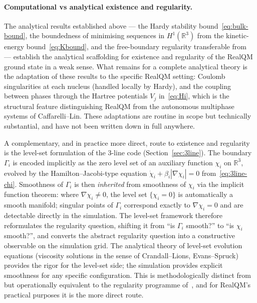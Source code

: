 \documentclass[11pt]{article}
\begin{document}
\paragraph{Computational vs analytical existence and regularity.}
The analytical results established above --- the Hardy stability bound~\eqref{eq:bulk-bound}, the boundedness of minimising sequences in $H^1(\mathbb{R}^3)$ from the kinetic-energy bound~\eqref{eq:Kbound}, and the free-boundary regularity transferable from~\cite{AltCaffarelli81, AltCaffarelliFriedman84, CaffarelliLin08, HHOT09} --- establish the analytical scaffolding for existence and regularity of the RealQM ground state in a weak sense. What remains for a complete analytical theory is the adaptation of these results to the specific RealQM setting: Coulomb singularities at each nucleus (handled locally by Hardy), and the coupling between phases through the Hartree potentials $V_j$ in~\eqref{eq:Hi}, which is the structural feature distinguishing RealQM from the autonomous multiphase systems of Caffarelli--Lin. These adaptations are routine in scope but technically substantial, and have not been written down in full anywhere.

A complementary, and in practice more direct, route to existence and regularity is the level-set formulation of the 3-line code (Section~\ref{sec:3line}). The boundary $\Gamma_i$ is encoded implicitly as the zero level set of an auxiliary function $\chi_i$ on $\mathbb{R}^3$, evolved by the Hamilton--Jacobi-type equation $\dot\chi_i + \beta_i |\nabla \chi_i| = 0$ from~\eqref{eq:3line-chi}. Smoothness of $\Gamma_i$ is then \emph{inherited} from smoothness of $\chi_i$ via the implicit function theorem: where $\nabla \chi_i \ne 0$, the level set $\{\chi_i = 0\}$ is automatically a smooth manifold; singular points of $\Gamma_i$ correspond exactly to $\nabla \chi_i = 0$ and are detectable directly in the simulation. The level-set framework therefore reformulates the regularity question, shifting it from ``is $\Gamma_i$ smooth?'' to ``is $\chi_i$ smooth?'', and converts the abstract regularity question into a constructive observable on the simulation grid. The analytical theory of level-set evolution equations (viscosity solutions in the sense of Crandall--Lions, Evans--Spruck) provides the rigor for the level-set side; the simulation provides explicit smoothness for any specific configuration. This is methodologically distinct from but operationally equivalent to the regularity programme of~\cite{AltCaffarelli81, CaffarelliLin08}, and for RealQM's practical purposes it is the more direct route.
\end{document}
